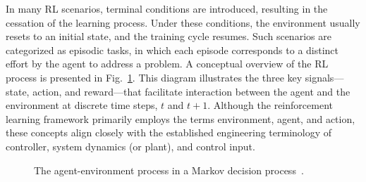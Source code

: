 \documentclass[conference]{IEEEtran}
\begin{document}
In many RL scenarios, terminal conditions are introduced, resulting in the cessation of the learning process. Under these conditions, the environment usually resets to an initial state, and the training cycle resumes. Such scenarios are categorized as episodic tasks, in which each episode corresponds to a distinct effort by the agent to address a problem.
A conceptual overview  of the RL process is presented in Fig.~\ref{fig:agent_env}. This diagram illustrates the three key signals---state, action, and reward---that facilitate interaction between the agent and the environment at discrete time steps, \( t \) and \( t+1 \). Although the reinforcement learning framework primarily employs the terms environment, agent, and action, these concepts align closely with the established engineering terminology of controller, system dynamics (or plant), and control input.
\begin{figure}[H]
	\begin{center}
	\end{center}
	\caption{The agent-environment process in a Markov decision process~\cite{Sutton}.}
	\label{fig:agent_env}
\end{figure}
\end{document}
